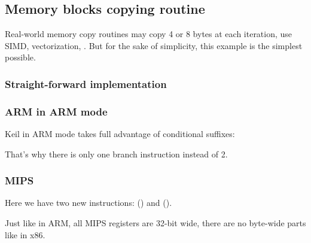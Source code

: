 ﻿\subsection{Memory blocks copying routine}
\label{loop_memcpy}

Real-world memory copy routines may copy 4 or 8 bytes at each iteration, use \ac{SIMD}, 
vectorization, \etc{}.
But for the sake of simplicity, this example is the simplest possible.



\subsubsection{Straight-forward implementation}







\subsubsection{ARM in ARM mode}

Keil in ARM mode takes full advantage of conditional suffixes:



That's why there is only one branch instruction instead of 2.

\subsubsection{MIPS}




Here we have two new instructions:  () and  ().

Just like in ARM, all MIPS registers are 32-bit wide, there are no byte-wide parts like in x86.

